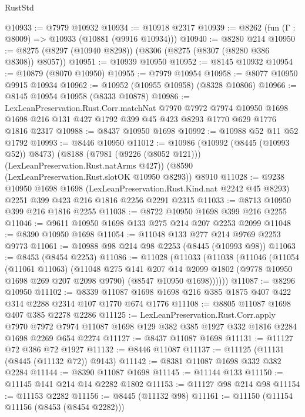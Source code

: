 \begin{lexlean}{RustStd}
\begin{coremodule}
@10933 := @7979 @10932
@10934 := @10918 @2317
@10939 := @8262 (fun (Γ : @8009) => @10933 (@10881 (@9916 @10934)))
@10940 := @8280 @214
@10950 := @8275 (@8297 (@10940 @8298)) (@8306 (@8275 (@8307 (@8280 @386 @8308)) @8057))
@10951 := @10939 @10950
@10952 := @8145 @10932
@10954 := @10879 (@8070 @10950)
@10955 := @7979 @10954
@10958 := @8077 @10950 @9915 @10934
@10962 := @10952 (@10955 @10958) (@8328 @10806)
@10966 := @8145 @10954 @10958 (@8333 @10878)
@10986 := LexLeanPreservation.Rust.Corr.matchNat
    @7970
    @7972
    @7974
    @10950
    @1698
    @1698
    @216
    @131
    @427
    @1792
    @399
    @45
    @423
    @8293
    @1770
    @629
    @1776
    @1816
    @2317
@10988 := @8437 @10950 @1698
@10992 := @10988 @52 @11 @52 @1792
@10993 := @8446 @10950
@11012 := @10986
    (@10992 (@8445 (@10993 @52)) @8473)
    (@8188 (@7981 (@9226 (@8052 @121))) (LexLeanPreservation.Rust.natArms @427))
    (@8590 (LexLeanPreservation.Rust.slotOK @10950 @8293))
    @8910
@11028 := @9238
    @10950
    @1698
    @1698
    (LexLeanPreservation.Rust.Kind.nat @2242 @45 @8293)
    @2251
    @399
    @423
    @216
    @1816
    @2256
    @2291
    @2315
@11033 := @8713 @10950 @399 @216 @1816 @2255
@11038 := @8722 @10950 @1698 @399 @216 @2255
@11046 := @9611 @10950 @1698 @133 @275 @214 @207 @2253 @2099
@11048 := @8390 @10950 @1698
@11054 := @11048 @133 @277 @214 @9769 @2253 @9773
@11061 := @10988 @98 @214 @98 @2253 (@8445 (@10993 @98))
@11063 := @8453 (@8454 @2253)
@11086 := @11028
    (@11033
      (@11038
        (@11046
          (@11054
            (@11061 @11063)
            (@11048
              @275
              @141
              @207
              @14
              @2099
              @1802
              (@9778 @10950 @1698 @269 @207 @2098 @9790)
              (@8547 @10950 @1698))))))
@11087 := @8296 @10950
@11102 := @8339 @11087 @1698 @1698 @216 @385 @1875 @407 @422 @314 @2288 @2314 @107 @1770 @674 @1776
@11108 := @8805 @11087 @1698 @407 @385 @2278 @2286
@11125 := LexLeanPreservation.Rust.Corr.apply
    @7970
    @7972
    @7974
    @11087
    @1698
    @129
    @382
    @385
    @1927
    @332
    @1816
    @2284
    @1698
    @2269
    @654
    @2274
@11127 := @8437 @11087 @1698
@11131 := @11127 @72 @386 @72 @1927
@11132 := @8446 @11087
@11137 := @11125 (@11131 (@8445 (@11132 @72)) @9143)
@11142 := @8381 @11087 @1698 @332 @382 @2284
@11144 := @8390 @11087 @1698
@11145 := @11144 @133
@11150 := @11145 @141 @214 @14 @2282 @1802
@11153 := @11127 @98 @214 @98
@11154 := @11153 @2282
@11156 := @8445 (@11132 @98)
@11161 := @11150 (@11154 @11156 (@8453 (@8454 @2282)))

\end{coremodule}
\end{lexlean}
